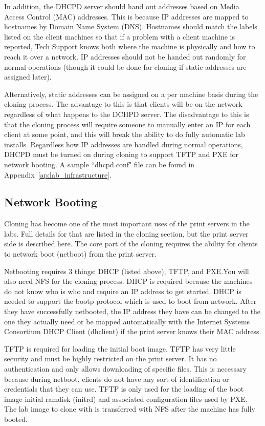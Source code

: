 In addition, the DHCPD server should hand out addresses based on Media Access Control (MAC) addresses.  This is because IP addresses are mapped to hostnames by Domain Name System (DNS).  Hostnames should match the labels listed on the client machines so that if a problem with a client machine is reported, Tech Support knows both where the machine is physically and how to reach it over a network.  IP addresses should not be handed out randomly for normal operations (though it could be done for cloning if static addresses are assigned later).  

Alternatively, static addresses can be assigned on a per machine basis during the cloning process.  The advantage to this is that clients will be on the network regardless of what happens to the DCHPD server.  The disadvantage to this is that the cloning process will require someone to manually enter an IP for each client at some point, and this will break the ability to do fully automatic lab installs.   Regardless how IP addresses are handled during normal operations, DHCPD must be turned on during cloning to support TFTP and PXE for network booting.  A sample ``dhcpd.conf" file can be found in Appendix~\ref{ap:lab_infrastructure}.

\subsection{Network Booting}
Cloning has become one of the most important uses of the print servers in the labs.  Full details for that are listed in the cloning section, but the print server side is described here.  The core part of the cloning requires the ability for clients to network boot (netboot) from the print server.  

Netbooting requires 3 things:  DHCP (listed above), TFTP, and PXE.You will also need NFS for the cloning process.  DHCP is required because the machines do not know who is who and require an IP address to get started.  DHCP is needed to support the bootp protocol which is used to boot from network.  After they have successfully netbooted, the IP address they have can be changed to the one they actually need or be mapped automatically with the Internet Systems Consortium DHCP Client (dhclient) if the print server knows their MAC address.  

TFTP is required for loading the initial boot image.  TFTP has very little security and must be highly restricted on the print server.  It has no authentication and only allows downloading of specific files.  This is necessary because during netboot, clients do not have any sort of identification or credentials that they can use.  TFTP is only used for the loading of the boot image initial ramdisk (initrd) and associated configuration files used by PXE.  The lab image to clone with is transferred with NFS after the machine has fully booted.  

